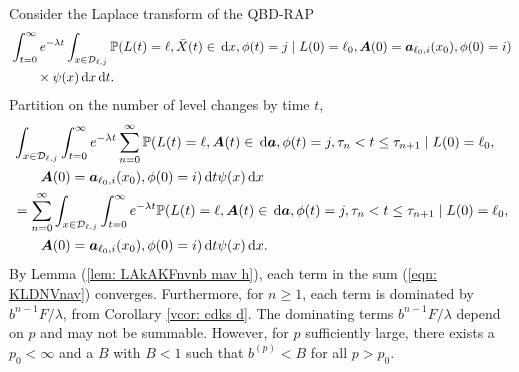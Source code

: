 Consider the Laplace transform of the QBD-RAP 
\begin{align}
	&\int_{t=0}^\infty e^{-\lambda t}\int_{x\in\mathcal D_{\ell,j}}\mathbb P(L(t) = \ell, \bar X(t) \in \, \mathrm{d} x, \phi(t) = j \mid L(0)=\ell_0, \boldsymbol A(0)=\boldsymbol  a_{\ell_0,i}(x_0), \phi(0)=i) \nonumber 
	\\&\qquad{}\times \psi(x)\, \mathrm{d} x\, \mathrm{d} t.
\end{align}
Partition on the number of level changes by time \(t\), 
\begin{align}
	&\int_{x\in\mathcal D_{\ell,j}} \int_{t=0}^\infty e^{-\lambda t}\sum_{n=0}^\infty \mathbb P(L(t) = \ell, \boldsymbol A(t) \in \, \mathrm{d} \boldsymbol a, \phi(t) = j, \tau_{n}< t \leq\tau_{n+1} \mid L(0)=\ell_0, \nonumber
	\\&\qquad{}\boldsymbol A(0)=\boldsymbol  a_{\ell_0,i}(x_0), \phi(0)=i)\, \mathrm{d} t \psi(x)\, \mathrm{d} x \nonumber
	\\&=\sum_{n=0}^\infty\int_{x\in\mathcal D_{\ell,j}}\int_{t=0}^\infty e^{-\lambda t} \mathbb P(L(t) = \ell, \boldsymbol A(t) \in \, \mathrm{d} \boldsymbol a, \phi(t) = j, \tau_{n}< t \leq\tau_{n+1} \mid L(0)=\ell_0, \nonumber
	\\&\qquad{}\boldsymbol A(0)=\boldsymbol  a_{\ell_0,i}(x_0), \phi(0)=i)\, \mathrm{d} t \psi(x) \, \mathrm{d} x. \label{eqn: KLDNVnav}
\end{align}
By Lemma (\ref{lem: LAkAKFnvnb mav h}), each term in the sum (\ref{eqn: KLDNVnav}) converges. Furthermore, for \(n\geq 1\), each term is dominated by \(b^{n-1}F/\lambda\), from Corollary \ref{vcor: cdks d}. The dominating terms \(b^{n-1}F/\lambda\) depend on \(p\) and may not be summable. However, for \(p\) sufficiently large, there exists a \(p_0<\infty\) and a \(B\) with \(B<1\) such that \(b^{(p)}<B\) for all \(p>p_0\). 

